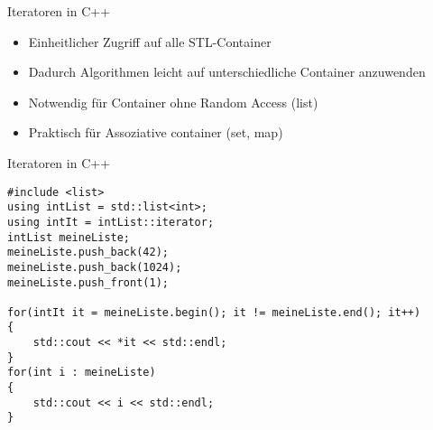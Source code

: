 \begin{frame}[fragile]{Iteratoren in C++}
	\begin{itemize}
		\item Einheitlicher Zugriff auf alle STL-Container
		\item Dadurch Algorithmen leicht auf unterschiedliche Container anzuwenden
		\item Notwendig für Container ohne Random Access (list)
		\item Praktisch für Assoziative container (set, map)
	\end{itemize}
\end{frame}

\begin{frame}[fragile]{Iteratoren in C++}
	
	\begin{lstlisting}[]
#include <list>
using intList = std::list<int>;
using intIt = intList::iterator;
intList meineListe;
meineListe.push_back(42);
meineListe.push_back(1024);
meineListe.push_front(1);

for(intIt it = meineListe.begin(); it != meineListe.end(); it++)
{
	std::cout << *it << std::endl;
}
for(int i : meineListe)
{
	std::cout << i << std::endl;
}
	\end{lstlisting}
\end{frame}

